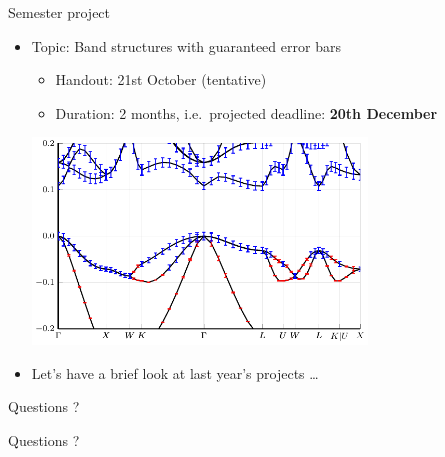 \begin{frame}{Semester project}
    \begin{itemize}
        \item Topic: \alert{Band structures with guaranteed error bars}
            \begin{itemize}
                \vspace{-0.5em}
                \item Handout: 21st October \textcolor{grey5}{(tentative)}
                \vspace{-0.5em}
                \item Duration: 2 months, i.e.~projected deadline: \textbf{20th December}
            \end{itemize}
        \vspace{1.5em}
        \begin{center}
        \includegraphics[width=0.7\textwidth]{img/si_band_errors.pdf}
        \end{center}
        \vspace{0.5em}
        \item Let's have a brief look at last year's projects \ldots
    \end{itemize}
\end{frame}

\begin{frame}{Questions ?}
    \begin{center}
        \huge{Questions ?}
    \end{center}
\end{frame}
